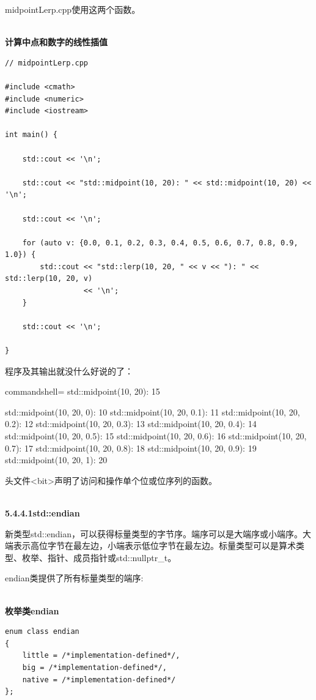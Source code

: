 midpointLerp.cpp使用这两个函数。

\hspace*{\fill} \\ %
\noindent
\textbf{计算中点和数字的线性插值}
\begin{lstlisting}[style=styleCXX]
// midpointLerp.cpp

#include <cmath>
#include <numeric>
#include <iostream>

int main() {
	
	std::cout << '\n';
	
	std::cout << "std::midpoint(10, 20): " << std::midpoint(10, 20) << '\n';
	
	std::cout << '\n';
	
	for (auto v: {0.0, 0.1, 0.2, 0.3, 0.4, 0.5, 0.6, 0.7, 0.8, 0.9, 1.0}) {
		std::cout << "std::lerp(10, 20, " << v << "): " << std::lerp(10, 20, v)
				  << '\n';
	}
	
	std::cout << '\n';
	
}
\end{lstlisting}

程序及其输出就没什么好说的了：

\begin{tcblisting}{commandshell={}}
std::midpoint(10, 20): 15

std::midpoint(10, 20, 0): 10
std::midpoint(10, 20, 0.1): 11
std::midpoint(10, 20, 0.2): 12
std::midpoint(10, 20, 0.3): 13
std::midpoint(10, 20, 0.4): 14
std::midpoint(10, 20, 0.5): 15
std::midpoint(10, 20, 0.6): 16
std::midpoint(10, 20, 0.7): 17
std::midpoint(10, 20, 0.8): 18
std::midpoint(10, 20, 0.9): 19
std::midpoint(10, 20, 1): 20
\end{tcblisting}


头文件<bit>声明了访问和操作单个位或位序列的函数。

\hspace*{\fill} \\ %
\noindent
\textbf{5.4.4.1\hspace{0.2cm}std::endian}

新类型std::endian，可以获得标量类型的字节序。端序可以是大端序或小端序。大端表示高位字节在最左边，小端表示低位字节在最左边。标量类型可以是算术类型、枚举、指针、成员指针或std::nullptr\_t。

endian类提供了所有标量类型的端序:

\hspace*{\fill} \\ %
\noindent
\textbf{枚举类endian}
\begin{lstlisting}[style=styleCXX]
enum class endian
{
	little = /*implementation-defined*/,
	big = /*implementation-defined*/,
	native = /*implementation-defined*/
};
\end{lstlisting}

